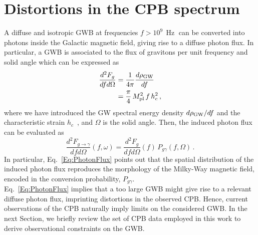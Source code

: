 \documentclass[twocolumn,superscriptaddress,floatfix,preprintnumbers, nofootinbib,hyperref]{revtex4-2}
\DeclareMathOperator{\Hz}{Hz}
\begin{document}
\section{Distortions in the CPB spectrum}
\label{sec:Distortion}
A diffuse and isotropic GWB at frequencies $f>10^{9}\,\Hz$ can be converted into photons inside the Galactic magnetic field, giving rise to a diffuse photon flux. In particular, a GWB is associated to the flux of gravitons per unit frequency and solid angle which can be expressed as~\cite{Maggiore:2000gv,Dandoy:2024oqg} 
\begin{equation}
    \begin{split}
        \frac{d^2F_g}{dfd\Omega}&= \frac{1}{4\pi}\frac{d\rho_{\rm GW}}{df}\\
        &=\frac{\pi}{4}\,M_{\rm pl}^2\,f\,h_c^2\,,
    \end{split}
\label{Eq:GravitonFlux}
\end{equation}
where we have introduced the GW spectral energy density $d\rho_{\rm GW}/df$ and the characteristic strain $h_c$~\cite{Maggiore:2000gv}, and $\Omega$ is the solid angle. Then, the induced photon flux can be evaluated as
\begin{equation}
    \frac{d^2 F_{g \rightarrow \gamma}}{df d\Omega}(f,\omega)=\frac{d^2F_g}{dfd\Omega}(f)\,P_{g\gamma}(f,\Omega)\,.
\label{Eq:PhotonFlux}
\end{equation}
In particular, Eq.~\eqref{Eq:PhotonFlux} points out that the spatial distribution of the induced photon flux reproduces the morphology of the Milky-Way magnetic field, encoded in the conversion probability, $P_{g\gamma}$.\\
Eq.~\eqref{Eq:PhotonFlux} implies that a too large GWB might give rise to a relevant diffuse photon flux, imprinting distortions in the observed CPB. Hence, current observations of the CPB naturally imply limits on the considered GWB. In the next Section, we briefly review the set of CPB data employed in this work to derive observational constraints on the GWB.
\end{document}

